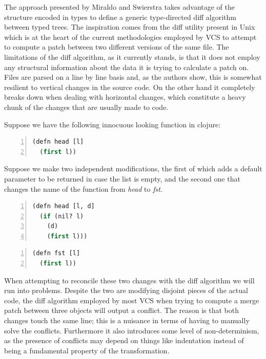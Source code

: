 \documentclass[11pt]{article}
\begin{document}
The approach presented by Miraldo and Swierstra \cite{type-directed-diff} takes advantage of the structure 
encoded in types to define a generic type-directed diff algorithm between
typed trees. The inspiration comes from the diff utility present in
Unix which is at the heart of the current methodologies employed by VCS
to attempt to compute a patch between two different versions of the same
file. The limitations of the diff algorithm, as it currently stands, is
that it does not employ any structural information about the data it is trying to calculate a patch on. 
Files are parsed on a line by line basis and, as the authors show, this is somewhat resilient to vertical changes in the
source code. On the other hand it completely breaks down when dealing with horizontal
changes, which constitute a heavy chunk of the changes that are usually
made to code.

Suppose we have the following innocuous looking function in clojure:

\begin{lstlisting}[language=lisp,numbers=left]
(defn head [l]
  (first l))
\end{lstlisting}

Suppose we make two independent modifications, the first of which adds a default 
parameter to be returned in case the list is empty, and the second one that 
changes the name of the function from \emph{head} to \emph{fst}.

\begin{lstlisting}[language=lisp,numbers=left]
(defn head [l, d]
  (if (nil? l)
    (d)
    (first l)))
\end{lstlisting}

\begin{lstlisting}[language=lisp,numbers=left]
(defn fst [l]
  (first l))
\end{lstlisting}

When attempting to reconcile these two changes with the diff algorithm we will run into problems.
Despite the two are modifying disjoint pieces of the 
actual code, the diff algorithm employed by most VCS when trying to 
compute a merge patch between three objects will output a conflict. 
The reason is that both changes touch the same line; this is a nuisance in  
terms of having to manually solve the conflicts. Furthermore it also 
introduces some level of non-determinism, as the presence of conflicts may depend on 
things like indentation instead of being a fundamental property of the 
transformation. 
\end{document}
